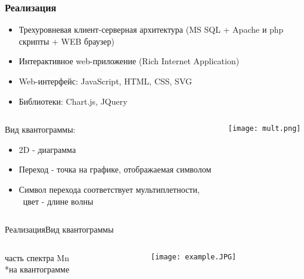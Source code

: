 \documentclass{beamer}
\begin{document}
\begin{frame}
\frametitle{Реализация}
    \begin{itemize}
        \item Трехуровневая клиент-серверная архитектура (MS SQL + Apache и php скрипты + WEB браузер)
        \item Интерактивное web-приложение (Rich Internet Application)
        \item Web-интерфейс: JavaScript, HTML, CSS, SVG
        \item Библиотеки: Chart.js, JQuery
    \end{itemize}
    \begin{columns}
    \begin{column}{0.7\textwidth}
       Вид квантограммы:
    \begin{itemize}
        \item 2D - диаграмма
        \item Переход - точка на графике, отображаемая символом
        \item Символ перехода соответствует мультиплетности, 
        \\~цвет - длине волны
    \end{itemize}
    \end{column}
    \begin{column}{0.25\textwidth}
      \texttt{[image: mult.png]}
    \end{column}
  \end{columns}
\end{frame}

\begin{frame}{Реализация}{Вид квантограммы}
\begin{columns}
    \begin{column}{0.4\textwidth}
         часть спектра Mn \\*на квантограмме
    \end{column}
    \begin{column}{0.5\textwidth}
      \texttt{[image: example.JPG]}
    \end{column}
  \end{columns}
\end{frame}
\end{document}
